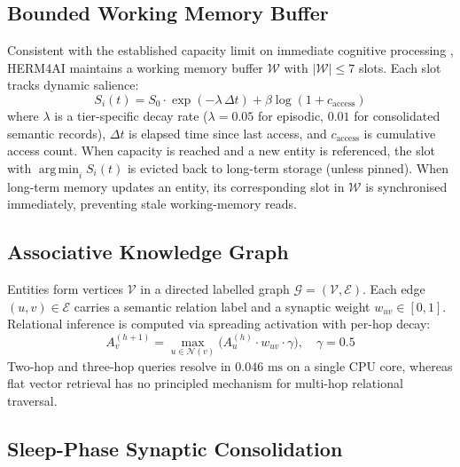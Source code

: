 \documentclass[11pt,a4paper,twocolumn]{article}
\DeclareMathOperator*{\argmin}{arg\,min}
\newcommand{\herm}{\textsc{HERM4AI}}
\begin{document}
\subsection{Bounded Working Memory Buffer}
\label{sec:wm}

Consistent with the established capacity limit on immediate cognitive
processing \citep{miller1956magical}, \herm{} maintains a working
memory buffer $\mathcal{W}$ with $|\mathcal{W}| \le 7$ slots.  Each
slot tracks dynamic salience:
\begin{equation}
  S_i(t) = S_0 \cdot \exp(-\lambda\,\Delta t)
            + \beta\log(1 + c_{\text{access}})
  \label{eq:salience}
\end{equation}
where $\lambda$ is a tier-specific decay rate ($\lambda = 0.05$ for
episodic, $0.01$ for consolidated semantic records), $\Delta t$ is
elapsed time since last access, and $c_{\text{access}}$ is cumulative
access count.  When capacity is reached and a new entity is referenced,
the slot with $\argmin_i S_i(t)$ is evicted back to long-term storage
(unless pinned).  When long-term memory updates an entity, its
corresponding slot in $\mathcal{W}$ is synchronised immediately,
preventing stale working-memory reads.

\subsection{Associative Knowledge Graph}
\label{sec:kg}

Entities form vertices $\mathcal{V}$ in a directed labelled graph
$\mathcal{G} = (\mathcal{V}, \mathcal{E})$.  Each edge $(u, v) \in
\mathcal{E}$ carries a semantic relation label and a synaptic weight
$w_{uv} \in [0, 1]$.  Relational inference is computed via spreading
activation with per-hop decay:
\begin{equation}
  A_v^{(h+1)} = \max_{u \in \mathcal{N}(v)}
  \bigl(A_u^{(h)} \cdot w_{uv} \cdot \gamma\bigr), \quad \gamma = 0.5
  \label{eq:spread}
\end{equation}
Two-hop and three-hop queries resolve in $0.046\text{ ms}$ on a single
CPU core, whereas flat vector retrieval has no principled mechanism for
multi-hop relational traversal.

\subsection{Sleep-Phase Synaptic Consolidation}
\label{sec:consolidation}
\end{document}
